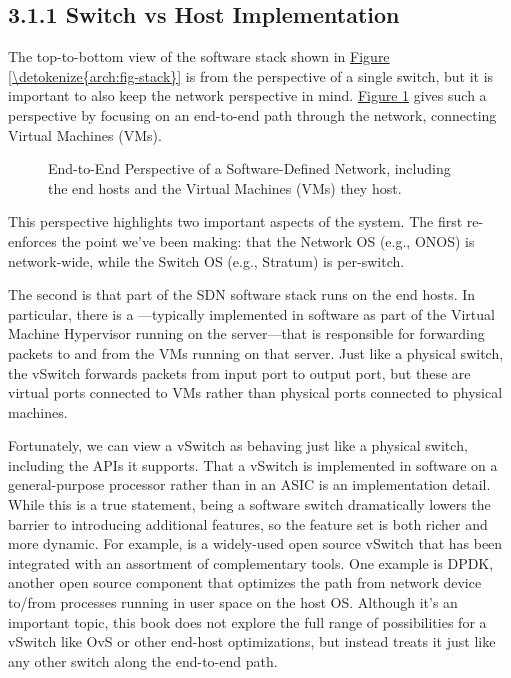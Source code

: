 \documentclass[letterpaper,11pt,english]{sphinxmanual}
\let\sphinxpxdimen\pdfpxdimen\else\newdimen\sphinxpxdimen
\begin{document}
\subsection{3.1.1 Switch vs Host Implementation}
\label{\detokenize{arch:switch-vs-host-implementation}}
The top-to-bottom view of the software stack shown in \hyperref[\detokenize{arch:fig-stack}]{Figure
\ref{\detokenize{arch:fig-stack}}} is from the perspective of a single switch, but it is
important to also keep the network perspective in
mind. \hyperref[\detokenize{arch:fig-e2e}]{Figure \ref{\detokenize{arch:fig-e2e}}} gives such a perspective by
focusing on an end-to-end path through the network, connecting
Virtual Machines (VMs).

\begin{figure}[htbp]
\centering
\capstart

\noindent\sphinxincludegraphics[width=500\sphinxpxdimen]{{Slide19}.png}
\caption{End-to-End Perspective of a Software-Defined Network, including
the end hosts and the Virtual Machines (VMs) they host.}\label{\detokenize{arch:id6}}\label{\detokenize{arch:fig-e2e}}\end{figure}

This perspective highlights two important aspects of the system. The
first re-enforces the point we’ve been making: that the Network OS
(e.g., ONOS) is network-wide, while the Switch OS (e.g., Stratum) is
per-switch.

The second is that part of the SDN software stack runs on the end
hosts. In particular, there is a —typically implemented in software as part of the Virtual Machine
Hypervisor running on the server—that is responsible for forwarding
packets to and from the VMs running on that server. Just like a
physical switch, the vSwitch forwards packets from input port to
output port, but these are virtual ports connected to VMs rather than
physical ports connected to physical machines.

Fortunately, we can view a vSwitch as behaving just like a physical
switch, including the APIs it supports. That a vSwitch is implemented
in software on a general-purpose processor rather than in an ASIC is
an implementation detail. While this is a true statement, being a
software switch dramatically lowers the barrier to introducing
additional features, so the feature set is both richer and more
dynamic. For example,  is a widely-used open
source vSwitch that has been integrated with an assortment of
complementary tools. One example is DPDK, another open source
component that optimizes the path from network device to/from
processes running in user space on the host OS. Although it’s an
important topic, this book does not explore the full range of
possibilities for a vSwitch like OvS or other end-host optimizations,
but instead treats it just like any other switch along the end-to-end
path.
\end{document}
